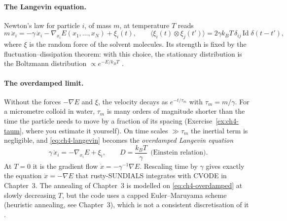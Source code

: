 \paragraph{The Langevin equation.} Newton's law for particle $i$, of mass $m$, at temperature $T$ reads
\begin{equation}\label{eq:ch4-langevin}
m\,\ddot x_i = -\gamma\,\dot x_i - \nabla_{x_i}E(x_1,\dots,x_N) + \xi_i(t),\qquad
\langle\xi_i(t)\otimes\xi_j(t')\rangle = 2\gamma k_BT\,\delta_{ij}\,\mathrm{Id}\;\delta(t-t'),
\end{equation}
where $\xi$ is the random force of the solvent molecules. Its strength is fixed by the fluctuation--dissipation
theorem: with this choice, the stationary distribution is the Boltzmann distribution $\propto e^{-E/k_BT}$ \tierC.

\paragraph{The overdamped limit.} Without the forces $-\nabla E$ and $\xi$, the velocity decays as
$e^{-t/\tau_m}$ with $\tau_m = m/\gamma$. For a micrometre colloid in water, $\tau_m$ is many orders of magnitude
shorter than the time the particle needs to move by a fraction of its spacing (Exercise~\ref{ex:ch4-taum}, where
you estimate it yourself). On time scales $\gg\tau_m$ the inertial term is negligible, and
\eqref{eq:ch4-langevin} becomes the \emph{overdamped Langevin equation}
\begin{equation}\label{eq:ch4-overdamped}
\gamma\,\dot x_i = -\nabla_{x_i}E + \xi_i ,\qquad D=\frac{k_BT}{\gamma}\ \ \text{(Einstein relation).}
\end{equation}
At $T=0$ it is the gradient flow $\dot x = -\gamma^{-1}\nabla E$. Rescaling time by $\gamma$ gives exactly the
equation $\dot x = -\nabla E$ that rusty-SUNDIALS integrates with CVODE in Chapter~3. The annealing of Chapter~3 is
modelled on \eqref{eq:ch4-overdamped} at slowly decreasing $T$, but the code uses a capped Euler--Maruyama scheme
(heuristic annealing, see Chapter~3), which is not a consistent discretisation of it \tierC.

